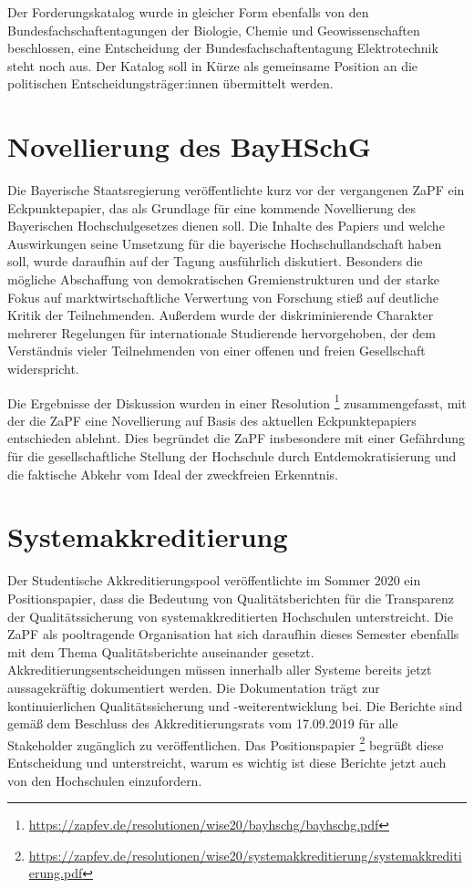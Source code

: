 Der Forderungskatalog wurde in gleicher Form ebenfalls von den Bundesfachschaftentagungen der Biologie, Chemie und Geowissenschaften beschlossen, eine Entscheidung der Bundesfachschaftentagung Elektrotechnik steht noch aus. Der Katalog soll in Kürze als gemeinsame Position an die politischen Entscheidungsträger:innen übermittelt werden.

\section*{Novellierung des BayHSchG}

Die Bayerische Staatsregierung veröffentlichte kurz vor der vergangenen ZaPF ein Eckpunktepapier, das als Grundlage für eine kommende Novellierung des Bayerischen Hochschulgesetzes dienen soll. Die Inhalte des Papiers und welche Auswirkungen seine Umsetzung für die bayerische Hochschullandschaft haben soll, wurde daraufhin auf der Tagung ausführlich diskutiert. Besonders die mögliche Abschaffung von demokratischen Gremienstrukturen und der starke Fokus auf marktwirtschaftliche Verwertung von Forschung stieß auf deutliche Kritik der Teilnehmenden. Außerdem wurde der diskriminierende Charakter mehrerer Regelungen für internationale Studierende hervorgehoben, der dem Verständnis vieler Teilnehmenden von einer offenen und freien Gesellschaft widerspricht.

Die Ergebnisse der Diskussion wurden in einer Resolution \footnote{\url{https://zapfev.de/resolutionen/wise20/bayhschg/bayhschg.pdf}} zusammengefasst, mit der die ZaPF eine Novellierung auf Basis des aktuellen Eckpunktepapiers entschieden ablehnt. Dies begründet die ZaPF insbesondere mit einer Gefährdung für die gesellschaftliche Stellung der Hochschule durch Entdemokratisierung und die faktische Abkehr vom Ideal der zweckfreien Erkenntnis.

\section*{Systemakkreditierung}

Der Studentische Akkreditierungspool veröffentlichte im Sommer 2020 ein Positionspapier, dass die Bedeutung von Qualitätsberichten für die Transparenz der Qualitätssicherung von systemakkreditierten Hochschulen unterstreicht. Die ZaPF als pooltragende Organisation hat sich daraufhin dieses Semester ebenfalls mit dem Thema Qualitätsberichte auseinander gesetzt. \\
Akkreditierungsentscheidungen müssen innerhalb aller Systeme bereits jetzt aussagekräftig dokumentiert werden. Die Dokumentation trägt zur kontinuierlichen Qualitätssicherung und -weiterentwicklung bei. Die Berichte sind gemäß dem Beschluss des Akkreditierungsrats vom 17.09.2019 für alle Stakeholder zugänglich zu veröffentlichen. Das Positionspapier \footnote{\url{https://zapfev.de/resolutionen/wise20/systemakkreditierung/systemakkreditierung.pdf}} begrüßt diese Entscheidung und unterstreicht, warum es wichtig ist diese Berichte jetzt auch von den Hochschulen einzufordern.

